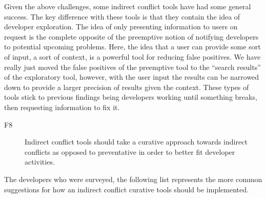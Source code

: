 \documentclass[conference]{IEEEtran}
\makeatletter
\def\namedlabel#1#2{\begingroup
   \def\@currentlabel{#2}%
   \label{#1}\endgroup
}
\makeatother
\begin{document}

Given the above challenges, some indirect conflict tools have had some general success. The key difference with these tools is that they
contain the idea of developer exploration. The idea of only presenting information to users on request is the complete opposite of the preemptive
notion of notifying developers to potential upcoming problems. Here, the idea that a user can provide some sort of
input, a sort of context, is a powerful tool for reducing false positives. We have really just moved the false positives of the preemptive
tool to the ``search results'' of the exploratory tool, however, with the user input the results can be narrowed down to provide a larger
precision of results given the context. These types of tools stick to previous findings being developers working until something breaks, then
requesting information to fix it.

\begin{description}
	\item[F8\namedlabel{itm:f8}{F8}] Indirect conflict tools should take a curative approach towards indirect conflicts as opposed to preventative
																	 in order to better fit developer activities.
\end{description}

The developers who were surveyed, the following list represents the more common suggestions for how an indirect conflict
curative tools should be implemented.
\end{document}
